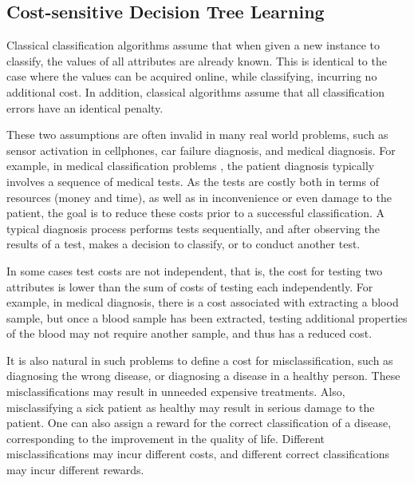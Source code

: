 \documentclass[letterpaper]{article}
\newcommand\commentout[1]{}
\theoremstyle{definition}
\begin{document}
\subsection{Cost-sensitive Decision Tree Learning}

Classical classification algorithms assume that when given a new instance to classify, the values of all attributes are already known. This is identical to the case where the values can be acquired online, while classifying, incurring no additional cost. In addition, classical algorithms assume that all classification errors have an identical penalty.

These two assumptions are often invalid in many real world problems, such as sensor activation in cellphones, car failure diagnosis, and medical diagnosis. For example, in medical classification problems \cite{turney1995cost}, the patient diagnosis typically involves a sequence of medical tests. As the tests are costly both in terms of resources (money and time), as well as in inconvenience or even damage to the patient, the goal is to reduce these costs prior to a successful classification. A typical diagnosis process performs tests sequentially, and after observing the results of a test, makes a decision to classify, or to conduct another test. 

\commentout{
It is often the case that less costly tests are also less informative. Hence, a simple escalation strategy starts with the simplest and least informative tests and then moves to more costly tests if need be. 
}
In some cases test costs are not independent, that is, the cost for testing two attributes is lower than the sum of costs of testing each independently. For example, in medical diagnosis, there is a cost associated with extracting a blood sample, but once a blood sample has been extracted, testing additional properties of the blood may not require another sample, and thus has a reduced cost.

It is also natural in such problems to define a cost for misclassification, such as diagnosing the wrong disease, or diagnosing a disease in a healthy person. These misclassifications may result in unneeded expensive treatments. Also, misclassifying a sick patient as healthy may result in serious damage to the  patient. One can also assign a reward for the correct classification of a disease, corresponding to the improvement in the quality of life. Different misclassifications may incur different costs, and different correct classifications may incur different rewards.
\end{document}
